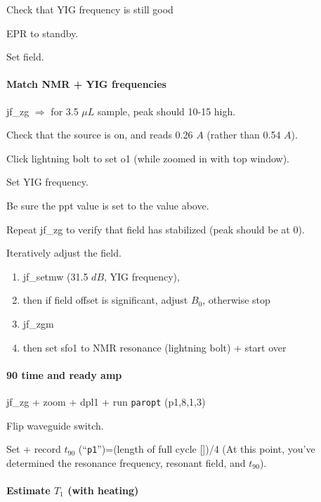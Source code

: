 \begin{scriptsize}
\begin{python}[off]
Check that YIG frequency is still good

EPR to standby.

Set field.

\paragraph{ Match NMR + YIG frequencies}
jf\_zg $\Rightarrow$ for 3.5 $\mu L$ sample, peak should 10-15 high.

Check that the source is on, and reads 0.26 $A$ (rather than 0.54 $A$).

Click lightning bolt to set o1 (while zoomed in with top window).

Set YIG frequency.

Be sure the ppt value is set to the value above.

Repeat jf\_zg to verify that field has stabilized (peak should be at 0).

Iteratively adjust the field.
{\small
\begin{enumerate}
	\item jf\_setmw (31.5 $dB$, YIG frequency),
	\item then if field offset is significant, adjust $B_0$, otherwise stop
	\item jf\_zgm
	\item then set sfo1 to NMR resonance (lightning bolt) + start over
\end{enumerate}
}

\paragraph{90 time and ready amp}
jf\_zg + zoom + dpl1 + run {\tt paropt} (p1,8,1,3)

Flip waveguide switch.

Set + record $t_{90}$ (``\texttt{p1}'')=(length of full cycle [\us])/4 (At this point, you've determined the resonance frequency, resonant field, and $t_{90}$).

\paragraph{Estimate $T_1$ (with heating)}


\end{python}
\end{scriptsize}
